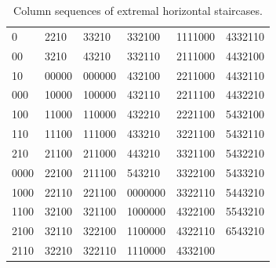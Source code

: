 \documentclass[reqno]{amsart}
\theoremstyle{definition}
\begin{document}
\begin{table}[thb]
\makeatletter
\def\ybb#1{%
\setbox\@tempboxa\hbox{#1}%
\begin{tikzpicture}\useasboundingbox(0,0)rectangle(0,0);
\fill[color=yellow!30] (-3pt,-3pt) rectangle (3pt+\wd\@tempboxa,10pt);
\end{tikzpicture}\unhbox\@tempboxa}
\makeatother\setlength\tabcolsep{10pt}
\begin{tabular}{llllll}
\ybb{0} & 2210 & 33210 & 332100 & 1111000 & 4332110\\
00 & \ybb{3210} & \ybb{43210} & 332110 & 2111000 & 4432100\\
\ybb{10} & 00000 & 000000 & 432100 & 2211000 & 4432110\\
000 & 10000 & 100000 & 432110 & 2211100 & 4432210\\
100 & 11000 & 110000 & 432210 & 2221100 & 5432100\\
110 & 11100 & 111000 & 433210 & 3221100 & 5432110\\
\ybb{210} & 21100 & 211000 & 443210 & 3321100 & 5432210\\
0000 & 22100 & 211100 &\ybb{543210} & 3322100 & 5433210\\
1000 & 22110 & 221100 & 0000000 & 3322110 & 5443210\\
1100 & 32100 & 321100 & 1000000 & 4322100 & 5543210\\
2100 & 32110 & 322100 & 1100000 & 4322110 & \ybb{6543210}\\
2110 & 32210 & 322110 & 1110000 & 4332100 &
\end{tabular}

\medskip

\caption{Column sequences of extremal horizontal
staircases.}\label{table:extremal}
\end{table}
\end{document}
